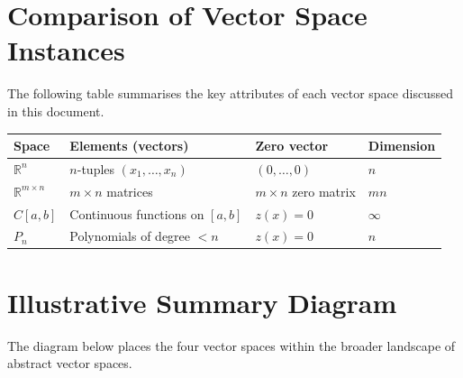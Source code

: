 \documentclass[12pt,a4paper]{article}
\newcommand{\R}{\mathbb{R}}
\begin{document}
\section{Comparison of Vector Space Instances}

\noindent
The following table summarises the key attributes of each vector space
discussed in this document.

\begin{center}
\renewcommand{\arraystretch}{1.5}
\begin{tabular}{>{\bfseries}p{2.8cm} p{3.2cm} p{3.2cm} p{3.5cm}}
  \toprule
  Space & Elements (vectors) & Zero vector & Dimension \\
  \midrule
  $\R^n$
    & $n$-tuples $(x_1,\ldots,x_n)$
    & $(0,\ldots,0)$
    & $n$ \\
  $\R^{m\times n}$
    & $m\times n$ matrices
    & $m\times n$ zero matrix
    & $mn$ \\
  $C[a,b]$
    & Continuous functions on $[a,b]$
    & $z(x)=0$
    & $\infty$ \\
  $P_n$
    & Polynomials of degree $<n$
    & $z(x)=0$
    & $n$ \\
  \bottomrule
\end{tabular}
\end{center}

\section{Illustrative Summary Diagram}

\noindent
The diagram below places the four vector spaces within the broader landscape
of abstract vector spaces.
\end{document}
